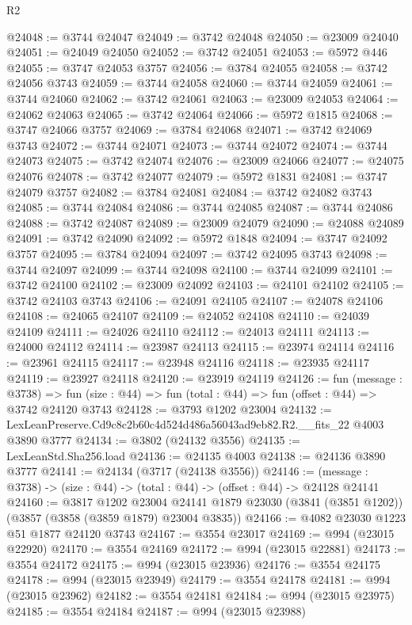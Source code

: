 \begin{lexlean}{R2}
\begin{coremodule}
@24048 := @3744 @24047
@24049 := @3742 @24048
@24050 := @23009 @24040
@24051 := @24049 @24050
@24052 := @3742 @24051
@24053 := @5972 @446
@24055 := @3747 @24053 @3757
@24056 := @3784 @24055
@24058 := @3742 @24056 @3743
@24059 := @3744 @24058
@24060 := @3744 @24059
@24061 := @3744 @24060
@24062 := @3742 @24061
@24063 := @23009 @24053
@24064 := @24062 @24063
@24065 := @3742 @24064
@24066 := @5972 @1815
@24068 := @3747 @24066 @3757
@24069 := @3784 @24068
@24071 := @3742 @24069 @3743
@24072 := @3744 @24071
@24073 := @3744 @24072
@24074 := @3744 @24073
@24075 := @3742 @24074
@24076 := @23009 @24066
@24077 := @24075 @24076
@24078 := @3742 @24077
@24079 := @5972 @1831
@24081 := @3747 @24079 @3757
@24082 := @3784 @24081
@24084 := @3742 @24082 @3743
@24085 := @3744 @24084
@24086 := @3744 @24085
@24087 := @3744 @24086
@24088 := @3742 @24087
@24089 := @23009 @24079
@24090 := @24088 @24089
@24091 := @3742 @24090
@24092 := @5972 @1848
@24094 := @3747 @24092 @3757
@24095 := @3784 @24094
@24097 := @3742 @24095 @3743
@24098 := @3744 @24097
@24099 := @3744 @24098
@24100 := @3744 @24099
@24101 := @3742 @24100
@24102 := @23009 @24092
@24103 := @24101 @24102
@24105 := @3742 @24103 @3743
@24106 := @24091 @24105
@24107 := @24078 @24106
@24108 := @24065 @24107
@24109 := @24052 @24108
@24110 := @24039 @24109
@24111 := @24026 @24110
@24112 := @24013 @24111
@24113 := @24000 @24112
@24114 := @23987 @24113
@24115 := @23974 @24114
@24116 := @23961 @24115
@24117 := @23948 @24116
@24118 := @23935 @24117
@24119 := @23927 @24118
@24120 := @23919 @24119
@24126 := fun (message : @3738) =>
  fun (size : @44) => fun (total : @44) => fun (offset : @44) => @3742 @24120 @3743
@24128 := @3793 @1202 @23004
@24132 := LexLeanPreserve.Cd9c8c2b60c4d524d486a56043ad9eb82.R2.__fits_22 @4003 @3890 @3777
@24134 := @3802 (@24132 @3556)
@24135 := LexLeanStd.Sha256.load
@24136 := @24135 @4003
@24138 := @24136 @3890 @3777
@24141 := @24134 (@3717 (@24138 @3556))
@24146 := (message : @3738) -> (size : @44) -> (total : @44) -> (offset : @44) -> @24128 @24141
@24160 := @3817
    @1202
    @23004
    @24141
    @1879
    @23030
    (@3841 (@3851 @1202))
    (@3857 (@3858 (@3859 @1879) @23004 @3835))
@24166 := @4082 @23030 @1223 @51 @1877 @24120 @3743
@24167 := @3554 @23017
@24169 := @994 (@23015 @22920)
@24170 := @3554 @24169
@24172 := @994 (@23015 @22881)
@24173 := @3554 @24172
@24175 := @994 (@23015 @23936)
@24176 := @3554 @24175
@24178 := @994 (@23015 @23949)
@24179 := @3554 @24178
@24181 := @994 (@23015 @23962)
@24182 := @3554 @24181
@24184 := @994 (@23015 @23975)
@24185 := @3554 @24184
@24187 := @994 (@23015 @23988)

\end{coremodule}
\end{lexlean}

